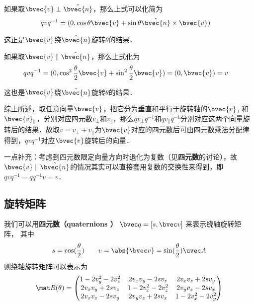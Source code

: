 如果取$\bvec{v}\perp\hat{\bvec{n}}$，那么上式可以化简为
\begin{equation}
\begin{aligned}
qvq^{-1}&=(0, \cos\theta\bvec{v}+\sin\theta\hat{\bvec{n}}\times\bvec{v})
\end{aligned}
\end{equation}

这正是$\bvec{v}$绕$\hat{\bvec{n}}$旋转$\theta$的结果．

如果取$\bvec{v}\parallel\hat{\bvec{n}}$，那么上式化为
\begin{equation}
\begin{aligned}
qvq^{-1}&=(0, \cos^2\frac{\theta}{2}\bvec{v}+\sin^2\frac{\theta}{2}\bvec{v})=(0, \bvec{v})=v
\end{aligned}
\end{equation}

这也是$\bvec{v}$绕$\hat{\bvec{n}}$旋转$\theta$的结果．

综上所述，取任意向量$\bvec{v}$，把它分为垂直和平行于旋转轴的$\bvec{v}_\perp$和$\bvec{v}_\parallel$，分别对应四元数$v_\perp$和$v_\parallel$，那么$q v_\perp q^{-1}$和$q v_\parallel q^{-1}$分别对应这两个向量旋转后的结果．故取$v=v_\perp+v_\parallel$为$\bvec{v}$对应的四元数后可由四元数乘法分配律得到，$qvq^{-1}$对应$\bvec{v}$旋转后的向量．

一点补充：考虑到四元数限定向量方向时退化为复数（见\textbf{四元数}的讨论），故$\bvec{v}\parallel\hat{\bvec{n}}$的情况其实可以直接套用复数的交换性来得到，即$qvq^{-1}=qq^{-1}v=v$．






\subsection{旋转矩阵}
我们可以用\textbf{四元数（quaternions ）} $\bvec q = [s, \bvec v]$ 来表示绕轴旋转矩阵， 其中
\begin{equation}
s = \cos(\frac{\theta}{2}) \qquad v = \abs{\bvec v} = \sin(\frac{\theta}{2})\uvec A
\end{equation}
则绕轴旋转矩阵可以表示为
\begin{equation}\label{QuatN_eq2}
\mat R(\theta) =
\begin{pmatrix}
1 - 2v_y^2 - 2v_z^2 & 2v_xv_y - 2sv_z  & 2v_x v_z + 2s v_y\\
2v_x v_y + 2sv_z & 1 - 2v_x^2 - 2v_z^2 & 2v_y v_z - 2s v_x\\
2v_x v_z - 2s v_y & 2v_y v_z + 2s v_x & 1 - 2v_x^2 - 2v_y^2
\end{pmatrix}
\end{equation}

